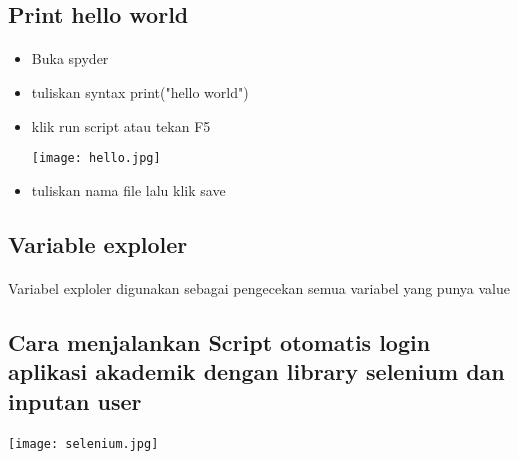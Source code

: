 \documentclass{article}
\begin{document}
\subsection{Print hello world}
\paragraph{}
\begin{itemize}
	\item Buka spyder\\
	\item tuliskan syntax print("hello world")
	\item klik run script atau tekan F5
	\begin{center}
	    \texttt{[image: hello.jpg]}
	\end{center}
	\item tuliskan nama file lalu klik save\\

\end{itemize}

\subsection{Variable exploler}
\paragraph{}
Variabel exploler digunakan sebagai pengecekan semua variabel yang punya value\\

\subsection{ Cara menjalankan Script otomatis login aplikasi akademik dengan library selenium dan inputan user}
\paragraph{}
\begin{center}
    \texttt{[image: selenium.jpg]} 
\end{center}
\end{document}
